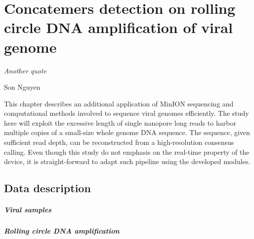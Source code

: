 \chapter{Concatemers detection on rolling circle DNA amplification of viral genome}\label{ch:concatemers}
\thispagestyle{empty}
\vspace*{\fill}
\epigraph{\emph{Another quote}}
{Son Nguyen}

\clearpage

This chapter describes an additional application of MinION sequencing and computational methods involved to sequence viral genomes efficiently.
The study here will exploit the excessive length of single nanopore long reads to harbor multiple copies of a small-size whole genome DNA sequence. The sequence, given sufficient read depth, can be reconstructed from a high-resolution consensus calling. 
Even though this study do not emphasis on the real-time property of the device, it is straight-forward to adapt such pipeline using the developed modules.

\section{Data description}
\paragraph{Viral samples}

\paragraph{Rolling circle DNA amplification}
